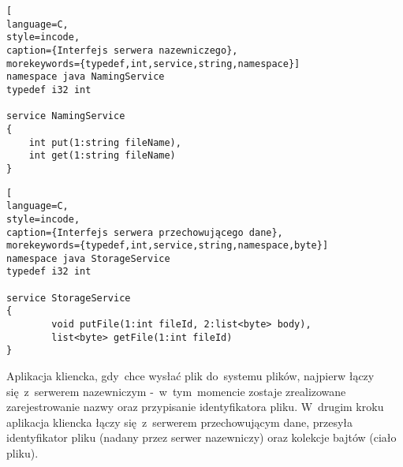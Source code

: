 \hspace*{-\parindent}%
\begin{minipage}{\linewidth}
\begin{lstlisting}[
language=C,
style=incode,
caption={Interfejs serwera nazewniczego},
morekeywords={typedef,int,service,string,namespace}]
namespace java NamingService
typedef i32 int

service NamingService
{
	int put(1:string fileName),
	int get(1:string fileName)
}
\end{lstlisting}
\end{minipage}

\hspace*{-\parindent}%
\begin{minipage}{\linewidth}
\begin{lstlisting}[
language=C,
style=incode,
caption={Interfejs serwera przechowującego dane},
morekeywords={typedef,int,service,string,namespace,byte}]
namespace java StorageService
typedef i32 int

service StorageService
{
        void putFile(1:int fileId, 2:list<byte> body),
        list<byte> getFile(1:int fileId)
}
\end{lstlisting}
\end{minipage}

\vspace{5mm}
Aplikacja kliencka, gdy~chce wysłać plik do~systemu plików, najpierw łączy
się~z~serwerem nazewniczym -~w~tym~momencie zostaje zrealizowane zarejestrowanie
nazwy oraz przypisanie identyfikatora pliku. W~drugim kroku aplikacja kliencka
łączy się~z~serwerem przechowującym dane, przesyła identyfikator pliku (nadany
przez serwer nazewniczy) oraz kolekcje bajtów (ciało pliku).

